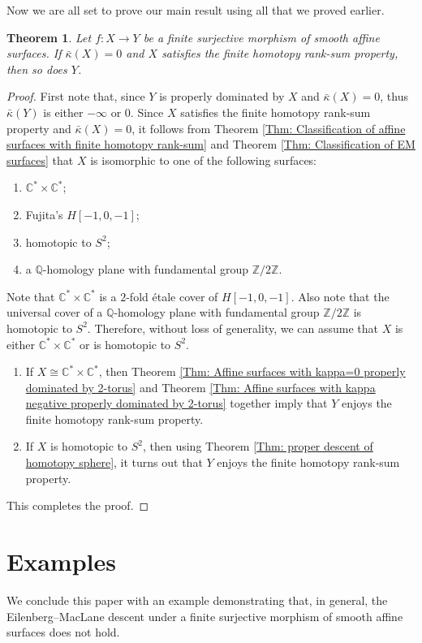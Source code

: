 \documentclass[12pt,reqno,twoside]{amsart}
\newtheorem{theorem}{Theorem}[section]
\theoremstyle{definition}
\numberwithin{equation}{section}
\newcommand{\C}{\mathbb{C}}
\newcommand{\Q}{\mathbb{Q}}
\newcommand{\Z}{\mathbb{Z}}
\newcommand{\Kbar}{\bar{\kappa}}
\begin{document}
Now we are all set to prove our main result using all that we proved earlier.

\begin{theorem}\label{Main Theorem - kappa bar = 0 case}
	Let $f \colon X \to Y$ be a finite surjective morphism of smooth affine surfaces. If $\Kbar(X)=0$ and $X$ satisfies the finite homotopy rank-sum property, then so does $Y$.
\end{theorem}
\begin{proof}
    First note that, since $Y$ is properly dominated by $X$ and $\Kbar(X)=0$, thus $\Kbar(Y)$ is either $-\infty$ or $0$. Since $X$ satisfies the finite homotopy rank-sum property and $\Kbar(X)=0$, it follows from Theorem \ref{Thm: Classification of affine surfaces with finite homotopy rank-sum} and Theorem \ref{Thm: Classification of EM surfaces} that $X$ is isomorphic to one of the following surfaces:
    \begin{enumerate}[\indent\rm(1)]
        \item $\C^*\times \C^*$;
        \item Fujita's $H[-1,0,-1]$;
        \item homotopic to $S^2$;
        \item a $\Q$-homology plane with fundamental group $\Z/2\Z$.
    \end{enumerate}
Note that $\C^*\times \C^*$ is a $2$-fold {\'e}tale cover of $H[-1,0,-1]$. Also note that the universal cover of a $\Q$-homology plane with fundamental group $\Z/2\Z$ is homotopic to $S^2$. Therefore, without loss of generality, we can assume that $X$ is either $\C^*\times \C^*$ or is homotopic to $S^2$. 
 
\begin{enumerate}[\indent---]
    \item If $X\cong \C^*\times \C^*$, then Theorem \ref{Thm: Affine surfaces with kappa=0 properly dominated by 2-torus} and Theorem \ref{Thm: Affine surfaces with kappa negative properly dominated by 2-torus} together imply that $Y$ enjoys the finite homotopy rank-sum property.
    
    \item If $X$ is homotopic to $S^2$, then using Theorem \ref{Thm: proper descent of homotopy sphere}, it turns out that $Y$ enjoys the finite homotopy rank-sum property.
\end{enumerate}
This completes the proof.
\end{proof}

\section{\bf Examples}
We conclude this paper with an example demonstrating that, in general, the Eilenberg–MacLane descent under a finite surjective morphism of smooth affine surfaces does not hold.
\end{document}
